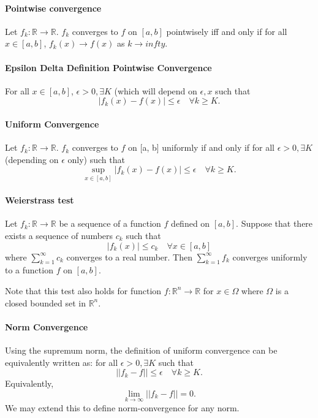 \paragraph{Pointwise convergence}
Let \(f_k: \mathbb{R} \to \mathbb{R}\). \(f_k\) converges to \(f\) on
\([a, b]\) pointwisely iff and only if for all \(x\in[a,b]\),
\(f_k(x)\to f(x)\) as \(k\to infty\).

\paragraph{Epsilon Delta Definition Pointwise Convergence}
For all \(x\in [a,b]\), \(\epsilon > 0, \exists K\) (which will depend on \(\epsilon, x\) such that
\[|f_k(x) - f(x)| \leq \epsilon \quad\forall k \geq K.\]

\paragraph{Uniform Convergence}
Let \(f_k: \mathbb{R}\to \mathbb{R}\). \(f_k\) converges to \(f\) on [a, b] uniformly if and only if
for all \(\epsilon > 0, \exists K\) (depending on \(\epsilon\) only) such that
\[
\sup_{x\in [a,b]} |f_k(x) - f(x)| \leq \epsilon \quad\forall k \geq K.
\]

\paragraph{Weierstrass test}
Let \(f_k: \mathbb{R}\to \mathbb{R}\) be a sequence of a function \(f\) defined on \([a, b]\).
Suppose that there exists a sequence of numbers \(c_k\) such that
\[|f_k(x)| \leq c_k \quad \forall x\in [a, b]\]
where \(\sum_{k=1}^\infty c_k\) converges to a real number.
Then
\(\sum_{k=1}^\infty f_k\) converges uniformly to a function \(f\) on \([a, b]\).

Note that this test also holds for function \(f: \mathbb{R}^n \to \mathbb{R}\) for \(x\in \Omega\) where \(\Omega\) is a closed bounded set in \(\mathbb{R}^n\).

\paragraph{Norm Convergence}
Using the supremum norm, the definition of uniform convergence can be equivalently written as:
for all \(\epsilon > 0, \exists K\) such that
\[
    ||f_k - f|| \leq \epsilon \quad \forall k \geq K.
\]
Equivalently,
\[\lim_{k\to\infty} ||f_k - f|| = 0.\]
We may extend this to define norm-convergence for any norm.

